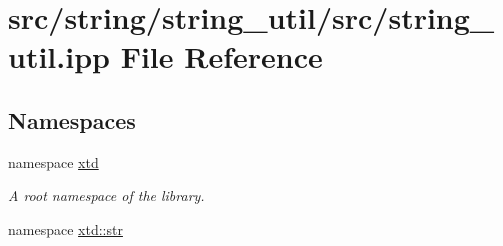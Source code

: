 \hypertarget{string__util_8ipp}{\section{src/string/string\-\_\-util/src/string\-\_\-util.ipp File Reference}
\label{string__util_8ipp}
}
\subsection*{Namespaces}
\begin{DoxyCompactItemize}
\item 
namespace \hyperlink{namespacextd}{xtd}
\begin{DoxyCompactList}\small\item\em A root namespace of the library. \end{DoxyCompactList}\item 
namespace \hyperlink{namespacextd_1_1str}{xtd\-::str}
\end{DoxyCompactItemize}
